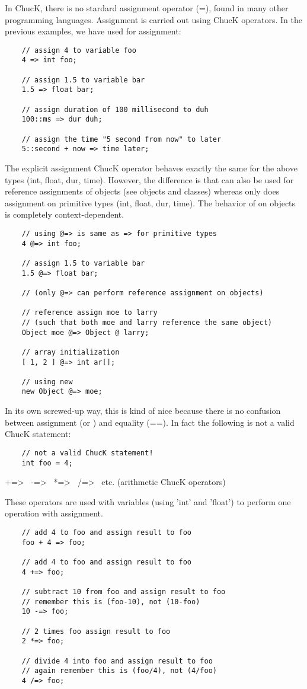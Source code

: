 In ChucK, there is no stardard assignment operator (=), found in many other programming languages. Assignment is carried out using ChucK operators. In the previous examples, we have used \chuckop for assignment:
\begin{verbatim}
    // assign 4 to variable foo
    4 => int foo;

    // assign 1.5 to variable bar
    1.5 => float bar;

    // assign duration of 100 millisecond to duh
    100::ms => dur duh;

    // assign the time "5 second from now" to later
    5::second + now => time later;
\end{verbatim}

The \atchuckop explicit assignment ChucK operator behaves exactly the same for the above types (int, float, dur, time). However, the difference is that \atchuckop can also be used for reference assignments of objects (see objects and classes) whereas \chuckop only does assignment on primitive types (int, float, dur, time). The behavior of \chuckop on objects is completely context-dependent.
\begin{verbatim}
    // using @=> is same as => for primitive types
    4 @=> int foo;

    // assign 1.5 to variable bar
    1.5 @=> float bar;

    // (only @=> can perform reference assignment on objects)

    // reference assign moe to larry
    // (such that both moe and larry reference the same object)
    Object moe @=> Object @ larry;

    // array initialization
    [ 1, 2 ] @=> int ar[];

    // using new
    new Object @=> moe;
\end{verbatim}

In its own screwed-up way, this is kind of nice because there is no confusion between assignment (\atchuckop or \chuckop) and equality (==). In fact the following is not a valid ChucK statement:
\begin{verbatim}
    // not a valid ChucK statement!
    int foo = 4;
\end{verbatim}


+=\textgreater~ -=\textgreater~ *=\textgreater~ /=\textgreater~ etc. (arithmetic ChucK operators)

These operators are used with variables (using 'int' and 'float') to perform one operation with assignment.
\begin{verbatim}
    // add 4 to foo and assign result to foo
    foo + 4 => foo;

    // add 4 to foo and assign result to foo
    4 +=> foo;

    // subtract 10 from foo and assign result to foo
    // remember this is (foo-10), not (10-foo)
    10 -=> foo;

    // 2 times foo assign result to foo
    2 *=> foo;

    // divide 4 into foo and assign result to foo
    // again remember this is (foo/4), not (4/foo)
    4 /=> foo;
\end{verbatim}

